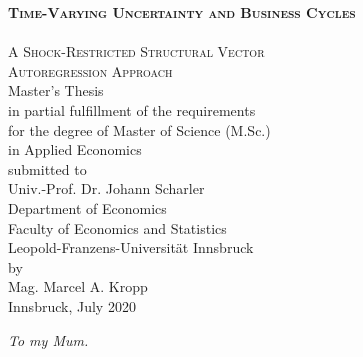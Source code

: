 \documentclass[a4paper,11pt,listof=nochaptergap,oneside,pointednumbers,bibtotoc,bigheadings,liststotoc,hidelinks]{scrbook}
\theoremstyle{mysatz}
\theoremstyle{mydefinition}
\theoremstyle{mytheorem}
\theoremstyle{mybemerkung}
\begin{document}
\begin{titlepage}
\begin{center}
        \Huge{\scshape\bfseries Time-Varying Uncertainty and Business Cycles} \\[-5mm]
        \HRule \\[2mm]
        \Large {\scshape A Shock-Restricted Structural Vector \\
        				Autoregression Approach} \\[10mm]
        \Large Master's Thesis \\[10mm]
        \Large in partial fulfillment of the requirements \\for the degree of Master of Science (M.Sc.)\\
                  in Applied Economics \\[10mm]
                  
        submitted to\\
        Univ.-Prof. Dr. Johann Scharler \\[10mm]
        Department of Economics\\
        Faculty of Economics and Statistics\\
        Leopold-Franzens-Universität Innsbruck \\[10mm]
        by \\ Mag. Marcel A. Kropp \\[10mm]
        Innsbruck, July 2020
    \end{center}
\end{titlepage}

\restoregeometry

\thispagestyle{empty} %
\null{}
    \begin{flushright}
       \large \textit{To my Mum.}\\
    \end{flushright}
\null
\end{document}
